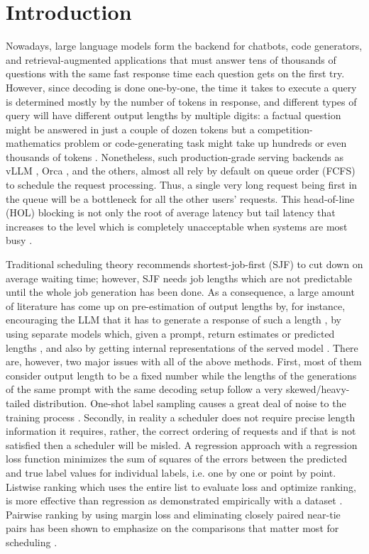 \documentclass[conference]{IEEEtran}
\begin{document}
\clearpage
\section{Introduction}
Nowadays, large language models form the backend for chatbots, code generators, and retrieval-augmented applications that must answer tens of thousands of questions with the same fast response time each question gets on the first try. However, since decoding is done one-by-one, the time it takes to execute a query is determined mostly by the number of tokens in response, and different types of query will have different output lengths by multiple digits: a factual question might be answered in just a couple of dozen tokens but a competition-mathematics problem or code-generating task might take up hundreds or even thousands of tokens \cite{fu2024efficient,tao2025pars}. Nonetheless, such production-grade serving backends as vLLM \cite{kwon2023pagedattention}, Orca \cite{yu2022orca}, and the others, almost all rely by default on queue order (FCFS) to schedule the request processing. Thus, a single very long request being first in the queue will be a bottleneck for all the other users' requests. This head-of-line (HOL) blocking is not only the root of average latency but tail latency that increases to the level which is completely unacceptable when systems are most busy \cite{fu2024efficient}.

Traditional scheduling theory recommends shortest-job-first (SJF) to cut down on average waiting time; however, SJF needs job lengths which are not predictable until the whole job generation has been done. As a consequence, a large amount of literature has come up on pre-estimation of output lengths by, for instance, encouraging the LLM that it has to generate a response of such a length \cite{zheng2023response}, by using separate models which, given a prompt, return estimates or predicted lengths \cite{jin2023s3,qiu2024ssjf}, and also by getting internal representations of the served model \cite{shahout2025trail,xie2026egtp}. There are, however, two major issues with all of the above methods. First, most of them consider output length to be a fixed number while the lengths of the generations of the same prompt with the same decoding setup follow a very skewed/heavy-tailed distribution. One-shot label sampling causes a great deal of noise to the training process \cite{wang2026prodm}. Secondly, in reality a scheduler does not require precise length information it requires, rather, the correct ordering of requests and if that is not satisfied then a scheduler will be misled. A regression approach with a regression loss function minimizes the sum of squares of the errors between the predicted and true label values for individual labels, i.e. one by one or point by point. Listwise ranking which uses the entire list to evaluate loss and optimize ranking, is more effective than regression as demonstrated empirically with a dataset \cite{fu2024efficient}. Pairwise ranking by using margin loss and eliminating closely paired near-tie pairs has been shown to emphasize on the comparisons that matter most for scheduling \cite{tao2025pars}.
\end{document}
